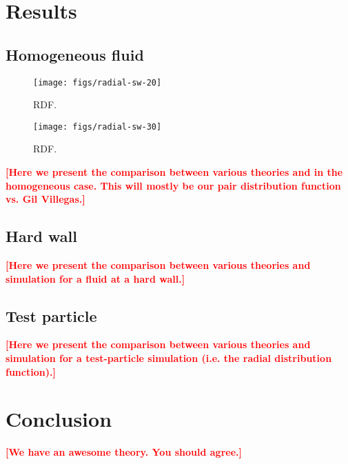 \documentclass[letterpaper,twocolumn,amsmath,amssymb,pre,aps,10pt]{revtex4-1}
\newcommand\fixme[1]{\textcolor{red}{\textbf{[#1]}}}
\begin{document}
\section{Results}

\subsection{Homogeneous fluid}

\begin{figure}[h]
\begin{center}
\texttt{[image: figs/radial-sw-20]}
\end{center}
\caption{RDF.}
\label{fig:homogeneous-20}
\end{figure}

\begin{figure}[h]
\begin{center}
\texttt{[image: figs/radial-sw-30]}
\end{center}
\caption{RDF.}
\label{fig:homogeneous-30}
\end{figure}

\fixme{Here we present the comparison between various theories and in
  the homogeneous case.  This will mostly be our pair distribution
  function vs. Gil Villegas.}

\subsection{Hard wall}

\fixme{Here we present the comparison between various theories and
  simulation for a fluid at a hard wall.}

\subsection{Test particle}

\fixme{Here we present the comparison between various theories and
  simulation for a test-particle simulation (i.e. the radial
  distribution function).}

\section{Conclusion}

\fixme{We have an awesome theory. You should agree.}

\end{document}
